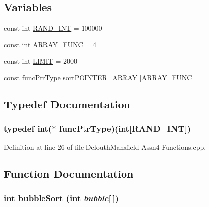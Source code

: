 \subsection*{Variables}
\begin{DoxyCompactItemize}
\item 
const int \hyperlink{_delouth_mansfield-_assn4-_functions_8cpp_a134c2ba56ae9ba89c77a5c0dba9f2124}{RAND\_\-INT} = 100000
\item 
const int \hyperlink{_delouth_mansfield-_assn4-_functions_8cpp_a3b95dd60d5c45f7cc3733769f3d54868}{ARRAY\_\-FUNC} = 4
\item 
const int \hyperlink{_delouth_mansfield-_assn4-_functions_8cpp_ab73857997d2049218b288a815758cb46}{LIMIT} = 2000
\item 
const \hyperlink{_delouth_mansfield-_assn4-_functions_8cpp_ae2987d0004dea58df8c833858c0fb370}{funcPtrType} \hyperlink{_delouth_mansfield-_assn4-_functions_8cpp_ae039780346621e190c7726c08c9a1a13}{sortPOINTER\_\-ARRAY} \mbox{[}\hyperlink{_delouth_mansfield-_assn4-_functions_8cpp_a3b95dd60d5c45f7cc3733769f3d54868}{ARRAY\_\-FUNC}\mbox{]}
\end{DoxyCompactItemize}


\subsection{Typedef Documentation}
\hypertarget{_delouth_mansfield-_assn4-_functions_8cpp_ae2987d0004dea58df8c833858c0fb370}{
\subsubsection[{funcPtrType}]{\setlength{\rightskip}{0pt plus 5cm}typedef int($\ast$ {\bf funcPtrType})(int\mbox{[}{\bf RAND\_\-INT}\mbox{]})}}
\label{_delouth_mansfield-_assn4-_functions_8cpp_ae2987d0004dea58df8c833858c0fb370}


Definition at line 26 of file DelouthMansfield-\/Assn4-\/Functions.cpp.



\subsection{Function Documentation}
\hypertarget{_delouth_mansfield-_assn4-_functions_8cpp_a8bb793ac49cd588089713622d18a8c5b}{
\subsubsection[{bubbleSort}]{\setlength{\rightskip}{0pt plus 5cm}int bubbleSort (int {\em bubble}\mbox{[}$\,$\mbox{]})}}
\label{_delouth_mansfield-_assn4-_functions_8cpp_a8bb793ac49cd588089713622d18a8c5b}


